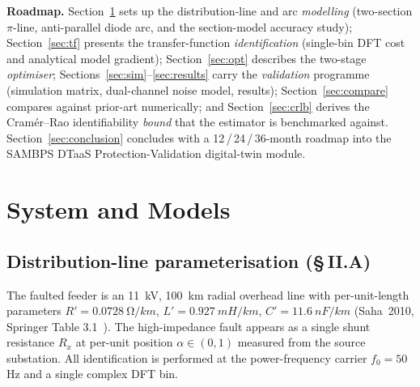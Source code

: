 \documentclass[journal]{IEEEtran}
\begin{document}
\noindent\textbf{Roadmap.}
Section~\ref{sec:models} sets up the distribution-line and arc
\emph{modelling} (two-section $\pi$-line, anti-parallel diode arc, and
the section-model accuracy study);
Section~\ref{sec:tf} presents the transfer-function
\emph{identification} (single-bin DFT cost and analytical model
gradient);
Section~\ref{sec:opt} describes the two-stage \emph{optimiser};
Sections~\ref{sec:sim}--\ref{sec:results} carry the
\emph{validation} programme (simulation matrix, dual-channel noise
model, results);
Section~\ref{sec:compare} compares against prior-art numerically; and
Section~\ref{sec:crlb} derives the Cram\'er--Rao identifiability
\emph{bound} that the estimator is benchmarked against.
Section~\ref{sec:conclusion} concludes with a 12\,/\,24\,/\,36-month
roadmap into the SAMBPS DTaaS Protection-Validation digital-twin
module.

\section{System and Models}\label{sec:models}

\subsection{Distribution-line parameterisation (\S\,II.A)}\label{sec:lineparam}
The faulted feeder is an \SI{11}{kV}, \SI{100}{km} radial overhead
line with per-unit-length parameters
$R' = \SI{0.0728}{\ohm/km}$,
$L' = \SI{0.927}{mH/km}$,
$C' = \SI{11.6}{nF/km}$
(Saha~2010, Springer Table 3.1~\cite{Saha2010BookFL}).
The high-impedance fault appears as a single shunt resistance $R_x$
at per-unit position $\alpha\in(0,1)$ measured from the source
substation.  All identification is performed at the
power-frequency carrier $f_0 = 50$\,Hz and a single complex DFT bin.
\end{document}
